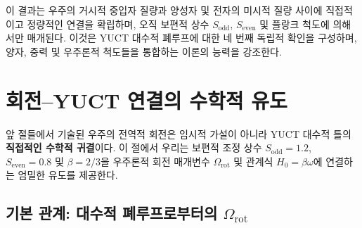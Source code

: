 \documentclass[11pt,a4paper]{article}
\newcommand{\Sodd}{S_{\mathrm{odd}}}
\newcommand{\Seven}{S_{\mathrm{even}}}
\begin{document}
	이 결과는 우주의 거시적 중입자 질량과 양성자 및 전자의 미시적 질량 사이에 직접적이고 정량적인 연결을 확립하며, 오직 보편적 상수 \(\Sodd\), \(\Seven\) 및 플랑크 척도에 의해서만 매개된다. 이것은 YUCT 대수적 폐루프에 대한 네 번째 독립적 확인을 구성하며, 양자, 중력 및 우주론적 척도들을 통합하는 이론의 능력을 강조한다.
	
	\section{회전–YUCT 연결의 수학적 유도}
	\label{sec:rotation-yuct}
	
	앞 절들에서 기술된 우주의 전역적 회전은 임시적 가설이 아니라 YUCT 대수적 틀의 \textbf{직접적인 수학적 귀결}이다. 이 절에서 우리는 보편적 조정 상수 \(S_{\mathrm{odd}}=1.2\), \(S_{\mathrm{even}}=0.8\) 및 \(\beta = 2/3\)을 우주론적 회전 매개변수 \(\Omega_{\mathrm{rot}}\) 및 관계식 \(H_0 = \beta\omega\)에 연결하는 엄밀한 유도를 제공한다.
	
	\subsection{기본 관계: 대수적 폐루프로부터의 \(\Omega_{\mathrm{rot}}\)}
	
\end{document}
